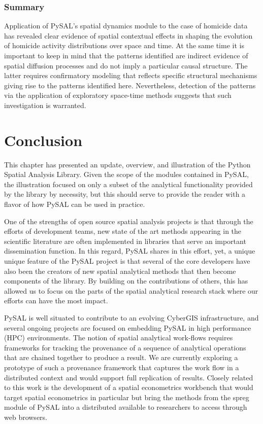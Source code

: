 \documentclass[11pt, titlepage]{amsart}
\begin{document}
\subsubsection{Summary}
Application of PySAL's  spatial dynamics module to the case of homicide data has
revealed clear evidence of spatial contextual effects in shaping the
evolution of homicide activity distributions over space and time. At the
same time it is important to keep in mind that the patterns identified
are indirect evidence of spatial diffusion processes and do not imply a
particular causal structure. The latter requires confirmatory modeling
that reflects specific structural mechanisms giving rise to the patterns
identified here. Nevertheless, detection of the patterns via the
application of exploratory space-time methods suggests that such investigation is
warranted.

\section{Conclusion}
This chapter has presented an update, overview, and illustration of the
Python Spatial Analysis Library. Given the scope of the modules
contained in PySAL, the illustration focused on only a subset of the
analytical functionality provided by the library by necessity, but this
should serve to provide the reader with a flavor of how PySAL can be
used in practice.

One of the strengths of open source spatial analysis projects is that
through the efforts of development teams, new state of the art methods
appearing in the scientific literature are often implemented in
libraries that serve an important dissemination function. In this
regard, PySAL shares in this effort, yet, a unique unique feature of the
PySAL project is that several of the core developers have also been the
creators of new spatial analytical methods that then become components
of the library. By building on the contributions of others, this has
allowed us to focus on the parts of the spatial analytical research
stack where our efforts can have the most impact.

PySAL is well situated to contribute to an evolving CyberGIS
infrastructure, and several ongoing projects are focused on embedding
PySAL in high performance (HPC) environments. The notion of spatial analytical work-flows
requires frameworks for tracking the provenance of a sequence of
analytical operations that are chained together to produce a result. We
are currently exploring a prototype of such a provenance framework that
captures the work flow in a distributed context and would support full
replication of results.  Closely related to this work is the development of a spatial
econometrics workbench \citep{Anselin:2011wt} that would target spatial econometrics in
particular but bring the methods from the spreg module of PySAL into a
distributed available to researchers to access through web browsers.
\end{document}
